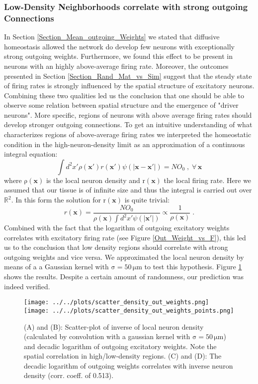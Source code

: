 \documentclass[10pt,a4paper]{article}
\begin{document}
\subsubsection{Low-Density Neighborhoods correlate with strong outgoing Connections}
In Section \ref{Section_Mean_outgoing_Weights} we stated that diffusive homeostasis allowed the network do develop few neurons with exceptionally strong outgoing weights. Furthermore, we found this effect to be present in neurons with an highly above-average firing rate. Moreover, the outcomes presented in Section \ref{Section_Rand_Mat_vs_Sim} suggest that the steady state of firing rates is strongly influenced by the spatial structure of excitatory neurons. Combining these two qualities led us the conclusion that one should be able to observe some relation between spatial structure and the emergence of "driver neurons". More specific, regions of neurons with above average firing rates should develop stronger outgoing connections. To get an intuitive understanding of what characterizes regions of above-average firing rates we interpreted the homeostatic condition in the high-neuron-density limit as an approximation of a continuous integral equation:
\begin{equation}
\int d^2 x' \rho(\mathbf{x}') r(\mathbf{x}') \psi(|\mathbf{x}-\mathbf{x}'|) = NO_0 \; , \; \forall \, \mathbf{x}
\label{Density_Limit_Hom}
\end{equation}
where $\mathrm{\rho(\mathbf{x})}$ is the local neuron density and $\mathrm{r(\mathbf{x})}$ the local firing rate. Here we assumed that our tissue is of infinite size and thus the integral is carried out over $\mathbb{R}^2$. In this form the solution for $\mathrm{r(\mathbf{x})}$ is quite trivial:
\begin{equation}
r(\mathbf{x}) = \frac{NO_0}{\rho(\mathbf{x}) \int d^2 x' \psi(|\mathbf{x}'|)} \propto \frac{1}{\rho(\mathbf{x})} \; .
\label{Density_Limit_Hom_Solution}
\end{equation}
Combined with the fact that the logarithm of outgoing excitatory weights correlates with excitatory firing rate (see Figure \ref{Out_Weight_vs_F}), this led us to the conclusion that low density regions should correlate with strong outgoing weights and vice versa. We approximated the local neuron density by means of a a Gaussian kernel with $\mathrm{\sigma = 50\, \mu m}$ to test this hypothesis. Figure \ref{Inverse_Dens_vs_Sum_Out_Weights} shows the results. Despite a certain amount of randomness, our prediction was indeed verified. 
\begin{figure}
\texttt{[image: ../../plots/scatter\_density\_out\_weights.png]}
\texttt{[image: ../../plots/scatter\_density\_out\_weights\_points.png]}
\caption{(A) and (B): Scatter-plot of inverse of local neuron density (calculated by convolution with a gaussian kernel with $\mathrm{\sigma = 50\, \mu m}$) and decadic logarithm of outgoing excitatory weights. Note the spatial correlation in high/low-density regions. (C) and (D): The decadic logarithm of outgoing weights correlates with inverse neuron density (corr. coeff. of 0.513).}
\label{Inverse_Dens_vs_Sum_Out_Weights}
\end{figure}
\end{document}
